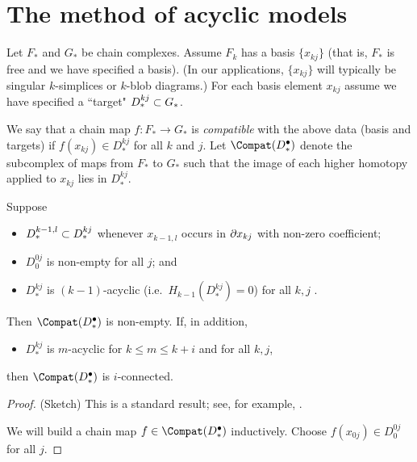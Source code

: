 
\section{The method of acyclic models}  \label{sec:moam}

Let $F_*$ and $G_*$ be chain complexes.
Assume $F_k$ has a basis $\{x_{kj}\}$
(that is, $F_*$ is free and we have specified a basis).
(In our applications, $\{x_{kj}\}$ will typically be singular $k$-simplices or 
$k$-blob diagrams.)
For each basis element $x_{kj}$ assume we have specified a ``target" $D^{kj}_*\subset G_*$.

We say that a chain map $f:F_*\to G_*$ is {\it compatible} with the above data (basis and targets)
if $f(x_{kj})\in D^{kj}_*$ for all $k$ and $j$.
Let $\Compat(D^\bullet_*)$ denote the subcomplex of maps from $F_*$ to $G_*$
such that the image of each higher homotopy applied to $x_{kj}$ lies in $D^{kj}_*$.

\begin{thm}
Suppose 
\begin{itemize}
\item $D^{k-1,l}_* \subset D^{kj}_*$ whenever $x_{k-1,l}$ occurs in $\partial x_{kj}$
with non-zero coefficient;
\item $D^{0j}_0$ is non-empty for all $j$; and
\item $D^{kj}_*$ is $(k{-}1)$-acyclic (i.e.\ $H_{k-1}(D^{kj}_*) = 0$) for all $k,j$ .
\end{itemize}
Then $\Compat(D^\bullet_*)$ is non-empty.
If, in addition,
\begin{itemize}
\item $D^{kj}_*$ is $m$-acyclic for $k\le m \le k+i$ and for all $k,j$,
\end{itemize}
then $\Compat(D^\bullet_*)$ is $i$-connected.
\end{thm}

\begin{proof}
(Sketch)
This is a standard result; see, for example, .

We will build a chain map $f\in \Compat(D^\bullet_*)$ inductively.
Choose $f(x_{0j})\in D^{0j}_0$ for all $j$.
\end{proof}